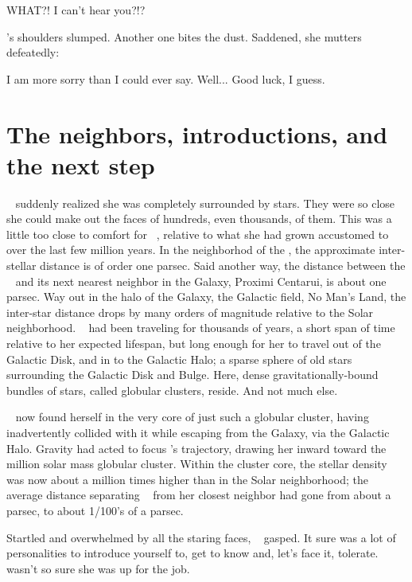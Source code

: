 \documentclass[main.tex]{subfiles}
\begin{document}
\newpara \Sterope WHAT?! I can't hear you?!?

\newpara \nar \rmsterope's shoulders slumped.  Another one bites the dust.  Saddened, she mutters defeatedly:

\newpara \Sterope I am more sorry than I could ever say.  Well... Good luck, I guess.  

\section{The neighbors, introductions, and the next step}

\newpara \nar \rmsterope~ suddenly realized she was completely surrounded by stars.  They were so close she could make out the faces of hundreds, even thousands, of them.  This was a little too close to comfort for \rmsterope~, relative to what she had grown accustomed to over the last few million years.  In the neighborhod of the \rmsun, the approximate inter-stellar distance is of order one parsec.  Said another way, the distance between the \rmsun~ and its next nearest neighbor in the Galaxy, Proximi Centarui, is about one parsec.  Way out in the halo of the Galaxy, the Galactic field, No Man's Land, the inter-star distance drops by many orders of magnitude relative to the Solar neighborhood.  \rmsterope~ had been traveling for thousands of years, a short span of time relative to her expected lifespan, but long enough for her to travel out of the Galactic Disk, and in to the Galactic Halo; a sparse sphere of old stars surrounding the Galactic Disk and Bulge.  Here, dense gravitationally-bound bundles of stars, called globular clusters, reside.  And not much else.

\newpara \nar \rmsterope~ now found herself in the very core of just such a globular cluster, having inadvertently collided with it while escaping from the Galaxy, via the Galactic Halo.  Gravity had acted to focus \rmsterope's trajectory, drawing her inward toward the million solar mass globular cluster.  Within the cluster core, the stellar density was now about a million times higher than in the Solar neighborhood; the average distance separating \rmsterope~ from her closest neighbor had gone from about a parsec, to about 1/100's of a parsec.  

\newpara \nar Startled and overwhelmed by all the staring faces, \rmsterope~ gasped.  It sure was a lot of personalities to introduce yourself to, get to know and, let's face it, tolerate.  \rmsterope~ wasn't so sure she was up for the job.
\end{document}

